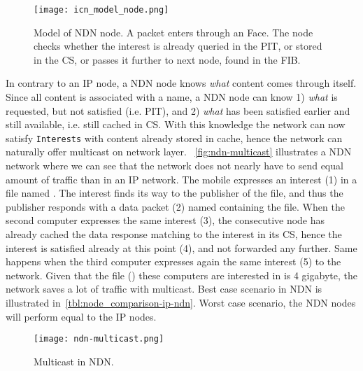 \begin{figure}[H]
  \centering
  \texttt{[image: icn\_model\_node.png]}
  \caption{Model of NDN node. A packet enters through an Face. 
  The node checks whether the \gls{interest} is already queried in the PIT, or stored in the CS, or passes it further to next node, found in the FIB.}
  \label{fig:icn-model-node}
\end{figure}

In contrary to an \gls{IP} node, a \gls{NDN} node knows \textit{what} content comes through itself. 
Since all content is associated with a \gls{name}, a \gls{NDN} node can know 1) \textit{what} is requested, but not satisfied (i.e. \gls{PIT}), and 2) \textit{what} has been satisfied earlier and still available, i.e. still cached in \gls{CS}.
With this knowledge the network can now satisfy \texttt{Interests} with content already stored in cache, hence the network can naturally offer multicast on network layer.
~\autoref{fig:ndn-multicast} illustrates a \gls{NDN} network where we can see that the network does not nearly have to send equal amount of traffic than in an \gls{IP} network.
The mobile expresses an \gls{interest} (1) in a file named .
The \gls{interest} finds its way to the \gls{publisher} of the file, and thus the \gls{publisher} responds with a \gls{data} packet (2) named  containing the file.
When the second computer expresses the same \gls{interest} (3), the consecutive node has already cached the \gls{data} response matching to the \gls{interest} in its \gls{CS}, hence the \gls{interest} is satisfied already at this point (4), and not forwarded any further.
Same happens when the third computer expresses again the same \gls{interest} (5) to the network.
Given that the file () these computers are interested in is 4 gigabyte, the network saves a lot of traffic with multicast.
Best case scenario in \gls{NDN} is illustrated in~\autoref{tbl:node_comparison-ip-ndn}.
Worst case scenario, the \gls{NDN} nodes will perform equal to the \gls{IP} nodes.

\begin{figure}[H]
  \centering
  \texttt{[image: ndn-multicast.png]}
  \caption{Multicast in NDN.}
  \label{fig:ndn-multicast}
\end{figure}

